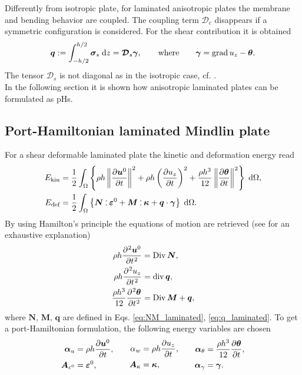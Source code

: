 Differently from isotropic plate, for laminated anisotropic plates the membrane and bending behavior are coupled. The coupling term $\bm{\mathcal{D}}_{c}$ disappears if a symmetric configuration is considered. For the shear contribution it is obtained
\begin{equation}\label{eq:q_laminated}
	\bm{q} := \int_{-h/2}^{h/2} \bm{\sigma}_{s} \d{z} = \bm{\mathcal{D}}_s \bm{\gamma}, \where \bm{\gamma}= \grad u_z - \bm{\theta}.
\end{equation} 
The tensor $\bm{\mathcal{D}}_s$ is not diagonal as in the isotropic case, cf. . \\

 In the following section it is shown how anisotropic laminated plates can be formulated as pHs.

\subsection{Port-Hamiltonian laminated Mindlin plate}
For a shear deformable laminated plate the kinetic and deformation energy read
\begin{equation*}
\begin{aligned}
E_{\text{kin}} &= \energy{\rho h \norm{\diffp{\bm{u}^0}{t}}^2 + \rho h \left(\diffp{u_z}{t}\right)^2 + \frac{\rho h^3}{12} \norm{\diffp{\bm{\theta}}{t}}^2}, \\
E_{\text{def}} &= \energy{\bm{N} \cddot \bm{\varepsilon}^0 + \bm{M} \cddot \bm{\kappa} + \bm{q} \cdot \bm{\gamma}}. 
\end{aligned}
\end{equation*}
By using Hamilton's principle the equations of motion are retrieved (see \cite[Chapter~3]{reddy2003mechanics} for an exhaustive explanation)
\begin{equation}\label{eq:sysLamMin}
	\begin{aligned}
	\rho h \diffp[2]{\bm{u}^0}{t} &= \Div \bm{N}, \\
	\rho h \diffp[2]{{u}_z}{t} &= \div \bm{q}, \\
	\frac{\rho h^3}{12}\diffp[2]{\bm{\theta}}{t} &= \Div \bm{M} + \bm{q}, \\
	\end{aligned}	
\end{equation}
where $\bm{N}, \, \bm{M}, \, \bm{q}$ are defined in Eqs. \eqref{eq:NM_laminated}, \eqref{eq:q_laminated}. 
To get a port-Hamiltonian formulation, the following energy variables are chosen
\begin{equation}
	\begin{aligned}
	\bm{\alpha}_u &= \rho h \diffp{\bm{u}^0}{t}, \\
	\bm{A}_{\varepsilon^0} &= \bm{\varepsilon}^0,
	\end{aligned} \qquad
	\begin{aligned}
	{\alpha}_w &= \rho h \diffp{{u}_z}{t}, \\
	\bm{A}_{\kappa} &= \bm{\kappa},
	\end{aligned} \qquad
	\begin{aligned}
	\bm{\alpha}_\theta &= \frac{\rho h^3}{12} \diffp{\bm{\theta}}{t}, \\
	\bm{\alpha}_{\gamma} &= \bm{\gamma}.
	\end{aligned}
\end{equation} 
